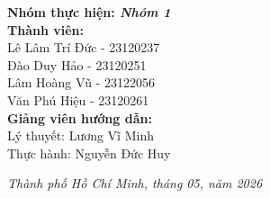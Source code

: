 \begin{titlepage}
\begin{center}
\end{center}

\vspace*{\fill}

\begin{flushleft}
\hspace{2.5cm}
{\fontsize{12}{16}\selectfont\bfseries\color{navyblue}
Nhóm thực hiện: \textit{Nhóm 1}}\\[0.2cm]
\hspace{2.5cm}
{\fontsize{12}{16}\selectfont\bfseries\color{navyblue}
Thành viên:}\\[0.1cm]
\hspace{3.0cm}
{\fontsize{12}{14}\selectfont\color{navyblue}
Lê Lâm Trí Đức - 23120237}\\[0.1cm]
\hspace{3.0cm}
{\fontsize{12}{14}\selectfont\color{navyblue}
Đào Duy Hảo - 23120251}\\[0.1cm]
\hspace{3.0cm}
{\fontsize{12}{14}\selectfont\color{navyblue}
Lâm Hoàng Vũ - 23122056}\\[0.1cm]
\hspace{3.0cm}
{\fontsize{12}{14}\selectfont\color{navyblue}
Văn Phú Hiệu - 23120261}\\[0.3cm]
\hspace{2.5cm}
{\fontsize{12}{16}\selectfont\bfseries\color{navyblue}
Giảng viên hướng dẫn:}\\[0.1cm]
\hspace{3.0cm}
{\fontsize{12}{14}\selectfont\color{navyblue}
Lý thuyết: Lương Vĩ Minh}\\[0.1cm]
\hspace{3.0cm}
{\fontsize{12}{14}\selectfont\color{navyblue}
Thực hành: Nguyễn Đức Huy}
\end{flushleft}

\vspace{0.8cm}

\begin{center}
{\fontsize{11}{13}\selectfont\itshape\color{navyblue}
Thành phố Hồ Chí Minh, tháng 05, năm 2026}
\end{center}

\vspace{0.4cm}

\end{titlepage}
